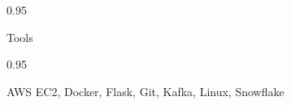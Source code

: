 \documentclass[a4paper,9pt]{article}
\newcommand{\doubleColumnGap}{\hspace{4mm}}
\newcommand{\mainLineSpacing}{0.95}
\begin{document}
\begin{minipage}[t]{0.20\linewidth}
  \begin{small}
    \begin{spacing}\mainLineSpacing{}
      \begin{flushright}
        Tools
      \end{flushright}
    \end{spacing}
  \end{small}
\end{minipage}
\doubleColumnGap{}
\begin{minipage}[t]{0.75\linewidth}
  \begin{small}
    \begin{spacing}\mainLineSpacing{}
      \begin{flushleft}
        AWS EC2, Docker, Flask, Git, Kafka, Linux, Snowflake
      \end{flushleft}
    \end{spacing}
  \end{small}
\end{minipage}
\end{document}
